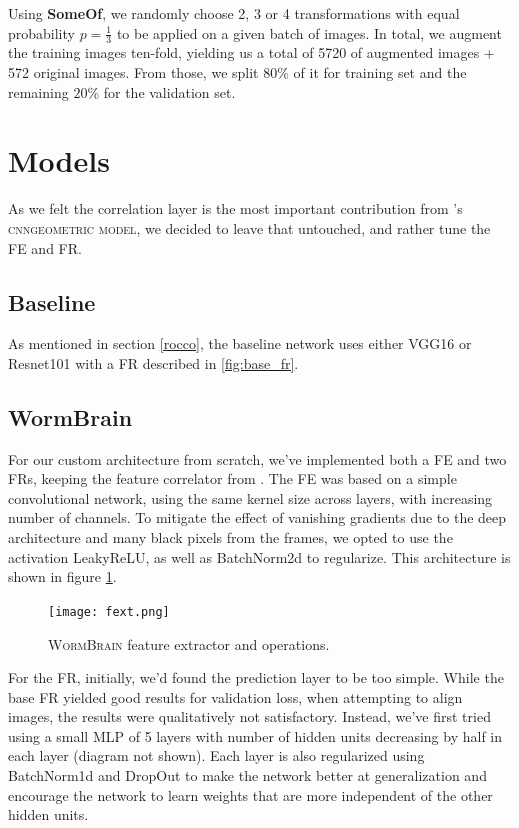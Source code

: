 \documentclass[10pt,conference,compsocconf]{IEEEtran}
\begin{document}
Using \textbf{SomeOf}, we randomly choose 2, 3 or 4 transformations with equal probability $p = \frac{1}{3}$ to be applied on a given batch of images. In total, we augment the training images ten-fold, yielding us a total of 5720 of augmented images + 572 original images. From those, we split $80\%$ of it for training set and the remaining $20\%$ for the validation set.


\section{\textbf{Models}}
As we felt the correlation layer is the most important contribution from \cite{roccoConvolutionalNeuralNetwork2017}'s \textsc{cnngeometric model}, we decided to leave that untouched, and rather tune the \textsc{FE} and \textsc{FR}. 

\subsection{Baseline}
As mentioned in section \ref{rocco}, the baseline network uses either VGG16 or Resnet101 with a \textsc{FR} described in \ref{fig:base_fr}.

\subsection{WormBrain}
For our custom architecture from scratch, we've implemented both a FE and two FRs, keeping the feature correlator from \cite{roccoConvolutionalNeuralNetwork2017}. The FE was based on a simple convolutional network, using the same kernel size across layers, with increasing number of channels. To mitigate the effect of vanishing gradients due to the deep architecture and many black pixels from the frames, we opted to use the activation LeakyReLU, as well as BatchNorm2d to regularize. This architecture is shown in figure \ref{fig:wb_fe}.

\vspace{-0.2cm}
\begin{figure}[h!]
    \centering
    \texttt{[image: fext.png]}
    \vspace{-0.45cm}
    \caption{\textsc{WormBrain} feature extractor and operations.}
    \label{fig:wb_fe}
\end{figure}
\vspace{-0.2cm}

For the FR, initially, we'd found the prediction layer to be too simple. While the base FR yielded good results for validation loss, when attempting to align images, the results were qualitatively not satisfactory. Instead, we've first tried using a small MLP of 5 layers with number of hidden units decreasing by half in each layer (diagram not shown). Each layer is also regularized using BatchNorm1d and DropOut to make the network better at generalization and encourage the network to learn weights that are more independent of the other hidden units. 
\end{document}
